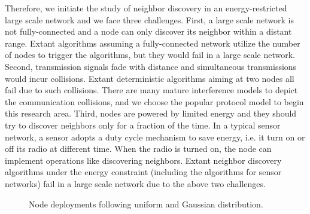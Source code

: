 Therefore, we initiate the study of neighbor discovery in an energy-restricted large scale network and we face three challenges. First, a large scale network is not fully-connected and a node can only discover its neighbor within a distant range. Extant algorithms assuming a fully-connected network utilize the number of nodes to trigger the algorithms, but they would fail in a large scale network. Second, transmission signals fade with distance and simultaneous transmissions would incur collisions. Extant deterministic algorithms aiming at two nodes all fail due to such collisions. There are many mature interference models to depict the communication collisions, and we choose the popular protocol model\cite{clark1990unit} to begin this research area. Third, nodes are powered by limited energy and they should try to discover neighbors only for a fraction of the time. In a typical sensor network\cite{akyildiz2002wireless}, a sensor adopts a duty cycle mechanism to save energy, i.e. it turn on or off its radio at different time. When the radio is turned on, the node can implement operations like discovering neighbors. Extant neighbor discovery algorithms under the energy constraint (including the algorithms for sensor networks) fail in a large scale network due to the above two challenges.

\begin{figure}[!t]
\centering
{}
\vspace{0.03in}
\caption{Node deployments following uniform and Gaussian distribution.}
\label{distribution}
\end{figure}


